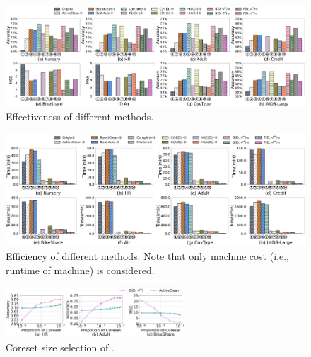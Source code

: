\begin{figure}
	\centering
	\includegraphics[width=\textwidth]{figs/effectiveness_new.pdf}
	\caption{Effectiveness of different methods.}
	\label{fig:effectiveness}
\end{figure}





\begin{figure}
	\centering
	\includegraphics[width=\textwidth]{figs/efficiency_new.pdf}
	\caption{Efficiency of different methods. Note that only machine cost (i.e., runtime of machine) is considered.}
	\label{fig:efficiency}
\end{figure}





\begin{figure}
	\vspace{-1em}
	\centering
	\includegraphics[width=0.6\textwidth]{figs/e2e}
	\caption{ Coreset size selection of \ours.}
	\label{fig:e2e}
\end{figure}





